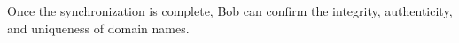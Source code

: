 Once the synchronization is complete, Bob can confirm the integrity, authenticity, and uniqueness of domain names.

%

